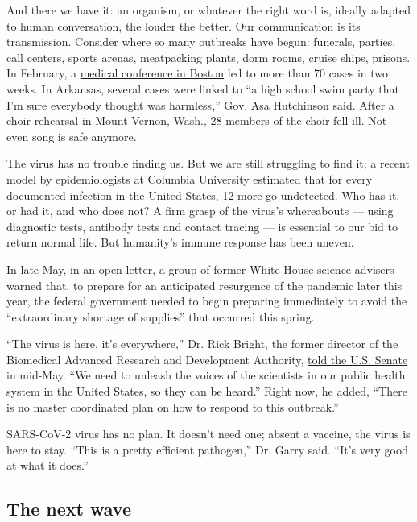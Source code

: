 And there we have it: an organism, or whatever the right word is,
ideally adapted to human conversation, the louder the better. Our
communication is its transmission. Consider where so many outbreaks have
begun: funerals, parties, call centers, sports arenas, meatpacking
plants, dorm rooms, cruise ships, prisons. In February, a
\href{https://www.nytimes3xbfgragh.onion/2020/04/12/us/coronavirus-biogen-boston-superspreader.html}{medical
conference in Boston} led to more than 70 cases in two weeks. In
Arkansas, several cases were linked to ``a high school swim party that
I'm sure everybody thought was harmless,'' Gov. Asa Hutchinson said.
After a choir rehearsal in Mount Vernon, Wash., 28 members of the choir
fell ill. Not even song is safe anymore.

The virus has no trouble finding us. But we are still struggling to find
it; a recent model by epidemiologists at Columbia University estimated
that for every documented infection in the United States, 12 more go
undetected. Who has it, or had it, and who does not? A firm grasp of the
virus's whereabouts --- using diagnostic tests, antibody tests and
contact tracing --- is essential to our bid to return normal life. But
humanity's immune response has been uneven.

In late May, in an open letter, a group of former White House science
advisers warned that, to prepare for an anticipated resurgence of the
pandemic later this year, the federal government needed to begin
preparing immediately to avoid the ``extraordinary shortage of
supplies'' that occurred this spring.

``The virus is here, it's everywhere,'' Dr. Rick Bright, the former
director of the Biomedical Advanced Research and Development Authority,
\href{https://www.rev.com/blog/transcripts/dr-rick-bright-testimony-transcript-vaccine-expert-whistleblower-ousted-by-trump-testifies}{told
the U.S. Senate} in mid-May. ``We need to unleash the voices of the
scientists in our public health system in the United States, so they can
be heard.'' Right now, he added, ``There is no master coordinated plan
on how to respond to this outbreak.''

SARS-CoV-2 virus has no plan. It doesn't need one; absent a vaccine, the
virus is here to stay. ``This is a pretty efficient pathogen,'' Dr.
Garry said. ``It's very good at what it does.''

\hypertarget{the-next-wave}{%
\subsection{The next wave}\label{the-next-wave}}

